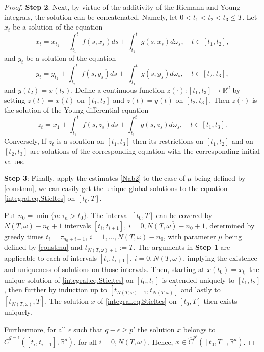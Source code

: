 \documentclass[10pt]{article}
\numberwithin{equation}{section} %
\newcommand{\R}{\ensuremath{\mathbb{R}}}
\begin{document}
\begin{proof}
{\bf{Step 2}}: Next, by virtue of the additivity of the Riemann and Young integrals, the solution can be concatenated. Namely,  let $0<t_1<t_2<t_3\leq T$. Let $x_t$ be a solution of the equation
$$
  x_t = x_{t_1} + \int_{t_1}^t f(s,x_s) ds +  \int_{t_1}^t g(s,x_s) d\omega_s, \quad t\in [t_1,t_2],
$$
  and $y_t$ be a solution of the equation
  $$
   y_t = y_{t_2} + \int_{t_2}^t f(s,y_s) ds + \ \int_{t_1}^t g(s,y_s) d\omega_s, \quad t\in [t_2,t_3], 
      $$
 and $y(t_2)=x(t_2)$. Define a continuous function $z(\cdot) : [t_1,t_3] \rightarrow\R^d$ by setting $z(t)=x(t)$ on $[t_1,t_2]$ and $z(t)=y(t)$ on $[t_2,t_3]$. Then $z(\cdot)$ is the solution of the Young differential equation
 $$
  z_t = x_1 + \int_{t_1}^t f(s,z_s) ds +  \int_{t_1}^t g(s,z_s) d\omega_s, \quad t\in [t_1,t_3].
 $$
 Conversely, If $z_t$ is a solution on $[t_1,t_3]$ then its restrictions on $[t_1,t_2]$ and on $[t_2,t_3]$ are solutions of the corresponding equation with the corresponding initial values.

{\bf Step 3}: Finally, apply the estimates \eqref{Nab2} to the case of $\mu$ being defined by \eqref{constmu}, we can easily get the unique global solutions to the equation \eqref{integral.eq.Stieltes} on $[t_0,T]$.

Put $n_0= \min\{n: \tau_n> t_0 \}$.	The interval $[t_0,T]$ can be covered by $N(T,\omega)-n_0+1$ intervals $[t_i,t_{i+1}]$, $i=\overline{0,N(T,\omega)-n_0+1}$, determined by greedy times $t_i=\tau_{n_0+i-1}$, $i=1,\ldots, N(T,\omega)-n_0$,  with parameter $\mu$ being defined by \eqref{constmu} and $t_{N(T,\omega)+1} :=T$. The arguments in {\bf{Step 1}} are applicable to each of intervals $[t_i,t_{i+1}]$, $i=\overline{0,N(T,\omega)}$, implying the existence and uniqueness of solutions on those intervals. Then, starting at $x(t_0) = x_{t_0}$ the unique solution of \eqref{integral.eq.Stieltes} on $[t_0,t_1]$ is extended uniquely to $[t_1,t_2]$, then further by induction up to  $[t_{N(T,\omega)-1},t_{N(T,\omega)}]$ and lastly to $[t_{N(T,\omega)},T]$. The solution $x$ of \eqref{integral.eq.Stieltes} on $[t_0,T]$ then exists uniquely.
	
	Furthermore, for all $\epsilon$ such that $q-\epsilon\geq p'$ the solution $x$ belongs to $\widehat{C}^{q-\epsilon}([t_i,t_{i+1}],\R^d)$, for all $i=\overline{0,N(T,\omega)}$. Hence, 
	$x\in \widehat{C}^{p'}([t_0,T],\R^d)$.
\end{proof}

\end{document}
